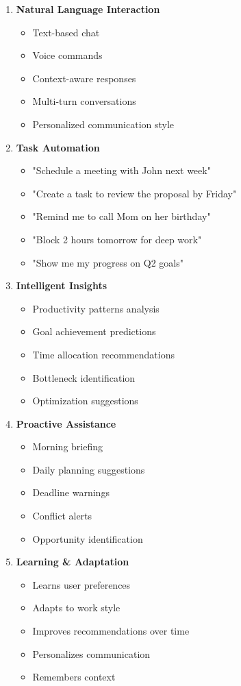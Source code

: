 \begin{enumerate}
    \item \textbf{Natural Language Interaction}
    \begin{itemize}
        \item Text-based chat
        \item Voice commands
        \item Context-aware responses
        \item Multi-turn conversations
        \item Personalized communication style
    \end{itemize}
    
    \item \textbf{Task Automation}
    \begin{itemize}
        \item "Schedule a meeting with John next week"
        \item "Create a task to review the proposal by Friday"
        \item "Remind me to call Mom on her birthday"
        \item "Block 2 hours tomorrow for deep work"
        \item "Show me my progress on Q2 goals"
    \end{itemize}
    
    \item \textbf{Intelligent Insights}
    \begin{itemize}
        \item Productivity patterns analysis
        \item Goal achievement predictions
        \item Time allocation recommendations
        \item Bottleneck identification
        \item Optimization suggestions
    \end{itemize}
    
    \item \textbf{Proactive Assistance}
    \begin{itemize}
        \item Morning briefing
        \item Daily planning suggestions
        \item Deadline warnings
        \item Conflict alerts
        \item Opportunity identification
    \end{itemize}
    
    \item \textbf{Learning \& Adaptation}
    \begin{itemize}
        \item Learns user preferences
        \item Adapts to work style
        \item Improves recommendations over time
        \item Personalizes communication
        \item Remembers context
    \end{itemize}
\end{enumerate}

